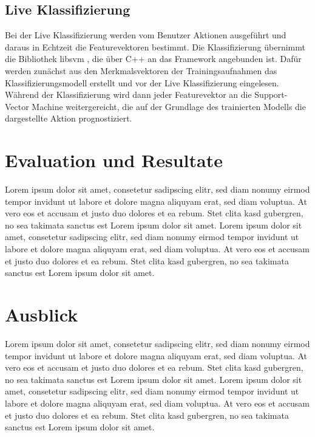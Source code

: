 \subsection{Live Klassifizierung}
Bei der Live Klassifizierung werden vom Benutzer Aktionen ausgeführt und daraus in Echtzeit die Featurevektoren bestimmt. Die Klassifizierung übernimmt die Bibliothek libsvm \cite{libsvm}, die über C++ an das Framework angebunden ist. Dafür werden zunächst aus den Merkmalsvektoren der Trainingsaufnahmen das Klassifizierungsmodell erstellt und vor der Live Klassifizierung eingelesen. Während der Klassifizierung wird dann jeder Featurevektor an die Support-Vector Machine weitergereicht, die auf der Grundlage des trainierten Modells die dargestellte Aktion prognostiziert. 



\section{Evaluation und Resultate}

Lorem ipsum dolor sit amet, consetetur sadipscing elitr, sed diam nonumy eirmod tempor invidunt ut labore et dolore magna aliquyam erat, sed diam voluptua. At vero eos et accusam et justo duo dolores et ea rebum. Stet clita kasd gubergren, no sea takimata sanctus est Lorem ipsum dolor sit amet. Lorem ipsum dolor sit amet, consetetur sadipscing elitr, sed diam nonumy eirmod tempor invidunt ut labore et dolore magna aliquyam erat, sed diam voluptua. At vero eos et accusam et justo duo dolores et ea rebum. Stet clita kasd gubergren, no sea takimata sanctus est Lorem ipsum dolor sit amet.


\section{Ausblick}

Lorem ipsum dolor sit amet, consetetur sadipscing elitr, sed diam nonumy eirmod tempor invidunt ut labore et dolore magna aliquyam erat, sed diam voluptua. At vero eos et accusam et justo duo dolores et ea rebum. Stet clita kasd gubergren, no sea takimata sanctus est Lorem ipsum dolor sit amet. Lorem ipsum dolor sit amet, consetetur sadipscing elitr, sed diam nonumy eirmod tempor invidunt ut labore et dolore magna aliquyam erat, sed diam voluptua. At vero eos et accusam et justo duo dolores et ea rebum. Stet clita kasd gubergren, no sea takimata sanctus est Lorem ipsum dolor sit amet.

